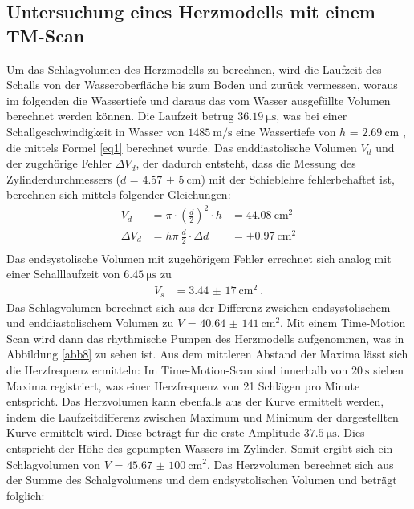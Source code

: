 \subsection{Untersuchung eines Herzmodells mit einem TM-Scan}
Um das Schlagvolumen des Herzmodells zu berechnen, wird die Laufzeit des Schalls von der Wasseroberfläche bis zum Boden und zurück vermessen, woraus
im folgenden die Wassertiefe und daraus das vom Wasser ausgefüllte Volumen berechnet werden können.
Die Laufzeit betrug $\SI{36,19}{\micro \second}$, was bei einer Schallgeschwindigkeit in Wasser von $\SI{1485}{\metre \per \second}$ \cite{Q2} eine
Wassertiefe von $h$ = $\SI{2,69}{\cm}$ , die mittels Formel \ref{eq1} berechnet wurde. Das enddiastolische Volumen $V_d$ und der zugehörige
Fehler $\Delta V_d$, der dadurch entsteht, dass die Messung des Zylinderdurchmessers ($d$ = $\SI{4,57(5)}{\cm}$) mit der Schieblehre fehlerbehaftet ist, berechnen sich
mittels folgender Gleichungen:
\FloatBarrier
\begin{align*}
  V_d &= \pi \cdot (\frac{d}{2})^2 \cdot h &= \SI{44,08}{\cm \squared}    \\
  \Delta V_d &=  h \pi~\frac{d}{2} \cdot \Delta d &= \pm \SI{0,97}{\cm \squared}    \\
\end{align*}
\FloatBarrier
Das endsystolische Volumen mit zugehörigem Fehler errechnet sich analog mit einer Schalllaufzeit von $\SI{6,45}{\micro \second}$ zu
\begin{align*}
  V_s &= \SI{3,44(17)}{\cm \squared} ~ .
\end{align*}
\FloatBarrier
Das Schlagvolumen berechnet sich aus der Differenz zwsichen endsystolischem und enddiastolischem Volumen zu $V$ = $\SI{40,64(141)}{\cm \squared}$.
Mit einem Time-Motion Scan wird dann das rhythmische Pumpen des Herzmodells aufgenommen, was in Abbildung \ref{abb8} zu sehen ist.
Aus dem mittleren Abstand der Maxima lässt sich die Herzfrequenz ermitteln: Im Time-Motion-Scan sind innerhalb von $\SI{20}{\second}$ sieben Maxima registriert,
was einer Herzfrequenz von 21 Schlägen pro Minute entspricht.
Das Herzvolumen kann ebenfalls aus der Kurve ermittelt werden, indem die Laufzeitdifferenz zwischen Maximum und Minimum der dargestellten Kurve
ermittelt wird. Diese beträgt für die erste Amplitude $\SI{37,5}{\micro \second}$. Dies entspricht der Höhe des gepumpten Wassers im Zylinder.
Somit ergibt sich ein Schlagvolumen von $V$ = $\SI{45,67(100)}{\cm \squared}$. Das Herzvolumen berechnet sich aus der Summe des Schalgvolumens
und dem endsystolischen Volumen und beträgt folglich:
